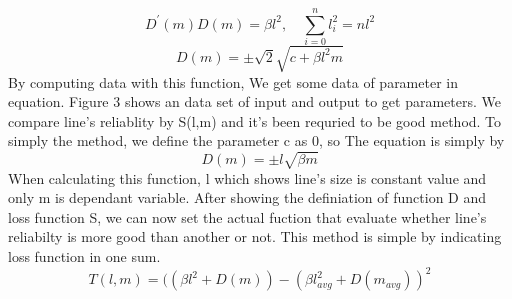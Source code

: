 \begin{equation}
\mathit{{D}^{\prime}(m)D(m) = \beta{l}^{2},\quad\sum_{i=0}^{n}{{l}_{i}^{2}} = n{l}^{2}}
\end{equation}
\begin{equation}
\mathit{D(m)=\pm\sqrt{2}\sqrt{c+\beta{l}^{2}m}}
\end{equation}
By computing data with this function, We get some data of parameter in equation. Figure 3 shows an data set of input and output to get parameters. We compare line's reliablity by S(l,m) and it's been requried to be good method. To simply the method, we define the parameter c as 0, so The equation is simply by
\begin{equation}
\mathit{D(m)=\pm l\sqrt{\beta m}}
\end{equation}
When calculating this function, l which shows line's size is constant value and only m is dependant variable. After showing the definiation of function D and loss function S, we can now set the actual fuction that evaluate whether line's reliabilty is more good than another or not. This method is simple by indicating loss function in one sum.
\begin{equation}
\mathit{T(l,m) = ((\beta l^{2}+D(m)) - (\beta {l}_{avg}^{2}+D(m_{avg}))^{2}}
\end{equation}	